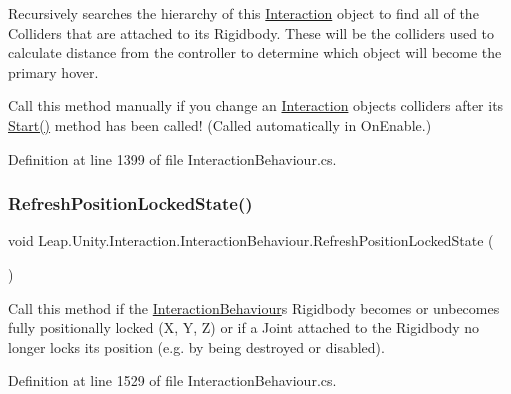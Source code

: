 Recursively searches the hierarchy of this \mbox{\hyperlink{namespace_leap_1_1_unity_1_1_interaction}{Interaction}} object to find all of the Colliders that are attached to its Rigidbody. These will be the colliders used to calculate distance from the controller to determine which object will become the primary hover. 

Call this method manually if you change an \mbox{\hyperlink{namespace_leap_1_1_unity_1_1_interaction}{Interaction}} object\textquotesingle{}s colliders after its \mbox{\hyperlink{class_leap_1_1_unity_1_1_interaction_1_1_interaction_behaviour_ae5fabec0a3dbf845c0307b5eb813e993}{Start()}} method has been called! (Called automatically in On\+Enable.) 

Definition at line 1399 of file Interaction\+Behaviour.\+cs.

\mbox{\label{class_leap_1_1_unity_1_1_interaction_1_1_interaction_behaviour_a33f9f48f2c6375cb926cc94ea2cb6f24}} 
\subsubsection{\texorpdfstring{RefreshPositionLockedState()}{RefreshPositionLockedState()}}
{\footnotesize\ttfamily void Leap.\+Unity.\+Interaction.\+Interaction\+Behaviour.\+Refresh\+Position\+Locked\+State (\begin{DoxyParamCaption}{ }\end{DoxyParamCaption})}



Call this method if the \mbox{\hyperlink{class_leap_1_1_unity_1_1_interaction_1_1_interaction_behaviour}{Interaction\+Behaviour}}\textquotesingle{}s Rigidbody becomes or unbecomes fully positionally locked (X, Y, Z) or if a Joint attached to the Rigidbody no longer locks its position (e.\+g. by being destroyed or disabled). 



Definition at line 1529 of file Interaction\+Behaviour.\+cs.

\mbox{\label{class_leap_1_1_unity_1_1_interaction_1_1_interaction_behaviour_a0745a6c1eff42ae2e13a3e624fffab93}} 

